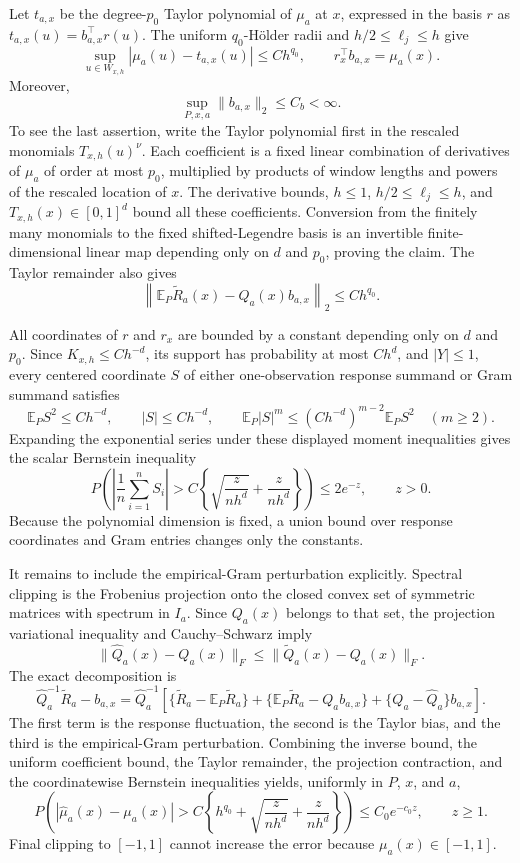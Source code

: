 Let \(t_{a,x}\) be the degree-\(p_0\) Taylor polynomial of \(\mu_a\) at \(x\), expressed in the basis \(r\) as \(t_{a,x}(u)=b_{a,x}^\top r(u)\). The uniform \(q_0\)-Hölder radii and \(h/2\le\ell_j\le h\) give
\[
\sup_{u\in W_{x,h}}|\mu_a(u)-t_{a,x}(u)|\le C h^{q_0},
\qquad
r_x^\top b_{a,x}=\mu_a(x).
\]
Moreover,
\[
\sup_{P,x,a}\|b_{a,x}\|_2\le C_b<\infty.
\]
To see the last assertion, write the Taylor polynomial first in the rescaled monomials \(T_{x,h}(u)^\nu\). Each coefficient is a fixed linear combination of derivatives of \(\mu_a\) of order at most \(p_0\), multiplied by products of window lengths and powers of the rescaled location of \(x\). The derivative bounds, \(h\le1\), \(h/2\le\ell_j\le h\), and \(T_{x,h}(x)\in[0,1]^d\) bound all these coefficients. Conversion from the finitely many monomials to the fixed shifted-Legendre basis is an invertible finite-dimensional linear map depending only on \(d\) and \(p_0\), proving the claim. The Taylor remainder also gives
\[
\left\|\mathbb E_P\widetilde R_a(x)-Q_a(x)b_{a,x}\right\|_2\le C h^{q_0}.
\]

All coordinates of \(r\) and \(r_x\) are bounded by a constant depending only on \(d\) and \(p_0\). Since \(K_{x,h}\le Ch^{-d}\), its support has probability at most \(Ch^d\), and \(|Y|\le1\), every centered coordinate \(S\) of either one-observation response summand or Gram summand satisfies
\[
\mathbb E_P S^2\le Ch^{-d},
\qquad
|S|\le Ch^{-d},
\qquad
\mathbb E_P|S|^m\le(Ch^{-d})^{m-2}\mathbb E_P S^2\quad(m\ge2).
\]
Expanding the exponential series under these displayed moment inequalities gives the scalar Bernstein inequality
\[
P\!\left(\left|\frac1n\sum_{i=1}^nS_i\right|>
C\left\{\sqrt{\frac{z}{nh^d}}+\frac{z}{nh^d}\right\}\right)
\le2e^{-z},
\qquad z>0.
\]
Because the polynomial dimension is fixed, a union bound over response coordinates and Gram entries changes only the constants.

It remains to include the empirical-Gram perturbation explicitly. Spectral clipping is the Frobenius projection onto the closed convex set of symmetric matrices with spectrum in \(I_a\). Since \(Q_a(x)\) belongs to that set, the projection variational inequality and Cauchy--Schwarz imply
\[
\|\widehat Q_a(x)-Q_a(x)\|_F
\le\|\widetilde Q_a(x)-Q_a(x)\|_F.
\]
The exact decomposition is
\[
\widehat Q_a^{-1}\widetilde R_a-b_{a,x}
=\widehat Q_a^{-1}\!\left[
\{\widetilde R_a-\mathbb E_P\widetilde R_a\}
+\{\mathbb E_P\widetilde R_a-Q_ab_{a,x}\}
+\{Q_a-\widehat Q_a\}b_{a,x}
\right].
\]
The first term is the response fluctuation, the second is the Taylor bias, and the third is the empirical-Gram perturbation. Combining the inverse bound, the uniform coefficient bound, the Taylor remainder, the projection contraction, and the coordinatewise Bernstein inequalities yields, uniformly in \(P\), \(x\), and \(a\),
\[
P\!\left(|\widehat\mu_a(x)-\mu_a(x)|>
C\left\{h^{q_0}+\sqrt{\frac{z}{nh^d}}+\frac{z}{nh^d}\right\}\right)
\le C_0e^{-c_0z},
\qquad z\ge1.
\]
Final clipping to \([-1,1]\) cannot increase the error because \(\mu_a(x)\in[-1,1]\).

